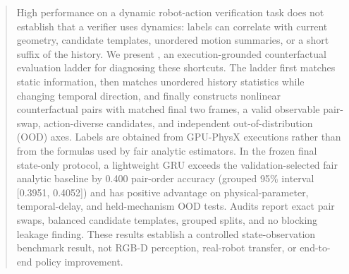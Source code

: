 \begin{abstract}
High performance on a dynamic robot-action verification task does not establish that a verifier uses dynamics: labels can correlate with current geometry, candidate templates, unordered motion summaries, or a short suffix of the history. We present \bench, an execution-grounded counterfactual evaluation ladder for diagnosing these shortcuts. The ladder first matches static information, then matches unordered history statistics while changing temporal direction, and finally constructs nonlinear counterfactual pairs with matched final two frames, a valid observable pair-swap, action-diverse candidates, and independent out-of-distribution (OOD) axes. Labels are obtained from GPU-PhysX executions rather than from the formulas used by fair analytic estimators. In the frozen final state-only protocol, a lightweight GRU exceeds the validation-selected fair analytic baseline by 0.400 pair-order accuracy (grouped 95\% interval [0.3951, 0.4052]) and has positive advantage on physical-parameter, temporal-delay, and held-mechanism OOD tests. Audits report exact pair swaps, balanced candidate templates, grouped splits, and no blocking leakage finding. These results establish a controlled state-observation benchmark result, not RGB-D perception, real-robot transfer, or end-to-end policy improvement.
\end{abstract}
